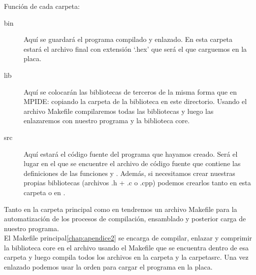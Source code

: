 Función de cada carpeta:
\begin{description}
	\item[bin] Aquí se guardará el programa compilado y enlazado. En esta carpeta estará el archivo final con extensión `.hex' que será el que carguemos en la placa.
	\item[lib] Aquí se colocarán las bibliotecas de terceros de la misma forma que en MPIDE: copiando la carpeta de la biblioteca en este directorio. Usando el archivo Makefile compilaremos todas las bibliotecas y luego las enlazaremos con nuestro programa y la biblioteca core.
	\item[src] Aquí estará el código fuente del programa que hayamos creado. Será el lugar en el que se encuentre el archivo de código fuente  que contiene las definiciones de las funciones  y . Además, si necesitamos crear nuestras propias bibliotecas (archivos .h + .c o .cpp) podemos crearlos tanto en esta carpeta o en .
\end{description}

Tanto en la carpeta principal como en  tendremos un archivo Makefile para la automatización de los procesos de compilación, ensamblado y posterior carga de nuestro programa.\\
El Makefile principal\ref{chap:apendice2} se encarga de compilar, enlazar y comprimir la biblioteca core en el archivo  usando el Makefile que se encuentra dentro de esa carpeta y luego compila todos los archivos en la carpeta  y la carpeta{src}. Una vez enlazado podemos usar la orden  para cargar el programa en la placa.


